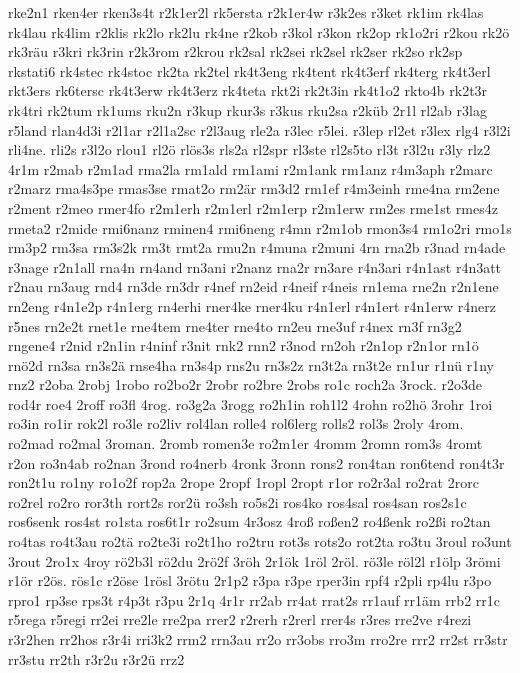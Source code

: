 {rke2n1
rken4er
rken3s4t
r2k1er2l
rk5ersta
r2k1er4w
r3k2es
r3ket
rk1im
rk4las
rk4lau
rk4lim
r2klis
rk2lo
rk2lu
rk4ne
r2kob
r3kol
r3kon
rk2op
rk1o2ri
r2kou
rk2ö
rk3räu
r3kri
rk3rin
r2k3rom
r2krou
rk2sal
rk2sei
rk2sel
rk2ser
rk2so
rk2sp
rkstati6
rk4stec
rk4stoc
rk2ta
rk2tel
rk4t3eng
rk4tent
rk4t3erf
rk4terg
rk4t3erl
rkt3ers
rk6tersc
rk4t3erw
rk4t3erz
rk4teta
rkt2i
rk2t3in
rk4t1o2
rkto4b
rk2t3r
rk4tri
rk2tum
rk1ums
rku2n
r3kup
rkur3s
r3kus
rku2sa
r2küb
2r1l
rl2ab
r3lag
r5land
rlan4d3i
r2l1ar
r2l1a2sc
r2l3aug
rle2a
r3lec
r5lei.
r3lep
rl2et
r3lex
rlg4
r3l2i
rli4ne.
rli2s
r3l2o
rlou1
rl2ö
rlös3s
rls2a
rl2spr
rl3ste
rl2s5to
rl3t
r3l2u
r3ly
rlz2
4r1m
r2mab
r2m1ad
rma2la
rm1ald
rm1ami
r2m1ank
rm1anz
r4m3aph
r2marc
r2marz
rma4s3pe
rmas3se
rmat2o
rm2är
rm3d2
rm1ef
r4m3einh
rme4na
rm2ene
r2ment
r2meo
rmer4fo
r2m1erh
r2m1erl
r2m1erp
r2m1erw
rm2es
rme1st
rmes4z
rmeta2
r2mide
rmi6nanz
rminen4
rmi6neng
r4mn
r2m1ob
rmon3s4
rm1o2ri
rmo1s
rm3p2
rm3sa
rm3s2k
rm3t
rmt2a
rmu2n
r4muna
r2muni
4rn
rna2b
r3nad
rn4ade
r3nage
r2n1all
rna4n
rn4and
rn3ani
r2nanz
rna2r
rn3are
r4n3ari
r4n1ast
r4n3att
r2nau
rn3aug
rnd4
rn3de
rn3dr
r4nef
rn2eid
r4neif
r4neis
rn1ema
rne2n
r2n1ene
rn2eng
r4n1e2p
r4n1erg
rn4erhi
rner4ke
rner4ku
r4n1erl
r4n1ert
r4n1erw
r4nerz
r5nes
rn2e2t
rnet1e
rne4tem
rne4ter
rne4to
rn2eu
rne3uf
r4nex
rn3f
rn3g2
rngene4
r2nid
r2n1in
r4ninf
r3nit
rnk2
rnn2
r3nod
rn2oh
r2n1op
r2n1or
rn1ö
rnö2d
rn3sa
rn3s2ä
rnse4ha
rn3s4p
rns2u
rn3s2z
rn3t2a
rn3t2e
rn1ur
r1nü
r1ny
rnz2
r2oba
2robj
1robo
ro2bo2r
2robr
ro2bre
2robs
ro1c
roch2a
3rock.
r2o3de
rod4r
roe4
2roff
ro3fl
4rog.
ro3g2a
3rogg
ro2h1in
roh1l2
4rohn
ro2hö
3rohr
1roi
ro3in
ro1ir
rok2l
ro3le
ro2liv
rol4lan
rolle4
rol6lerg
rolls2
rol3s
2roly
4rom.
ro2mad
ro2mal
3roman.
2romb
romen3e
ro2m1er
4romm
2romn
rom3s
4romt
r2on
ro3n4ab
ro2nan
3rond
ro4nerb
4ronk
3ronn
rons2
ron4tan
ron6tend
ron4t3r
ron2t1u
ro1ny
ro1o2f
rop2a
2rope
2ropf
1ropl
2ropt
r1or
ro2r3al
ro2rat
2rorc
ro2rel
ro2ro
ror3th
rort2s
ror2ü
ro3sh
ro5s2i
ros4ko
ros4sal
ros4san
ros2s1c
ros6senk
ros4st
ro1sta
ros6t1r
ro2sum
4r3osz
4roß
roßen2
ro4ßenk
ro2ßi
ro2tan
ro4tas
ro4t3au
ro2tä
ro2te3i
ro2t1ho
ro2tru
rot3s
rots2o
rot2ta
ro3tu
3roul
ro3unt
3rout
2ro1x
4roy
rö2b3l
rö2du
2rö2f
3röh
2r1ök
1röl
2röl.
rö3le
röl2l
r1ölp
3römi
r1ör
r2ös.
rös1c
r2öse
1rösl
3rötu
2r1p2
r3pa
r3pe
rper3in
rpf4
r2pli
rp4lu
r3po
rpro1
rp3se
rps3t
r4p3t
r3pu
2r1q
4r1r
rr2ab
rr4at
rrat2s
rr1auf
rr1äm
rrb2
rr1c
r5rega
r5regi
rr2ei
rre2le
rre2pa
rrer2
r2rerh
r2rerl
rrer4s
r3res
rre2ve
r4rezi
r3r2hen
rr2hos
r3r4i
rri3k2
rrm2
rrn3au
rr2o
rr3obs
rro3m
rro2re
rrr2
rr2st
rr3str
rr3stu
rr2th
r3r2u
r3r2ü
rrz2
}
